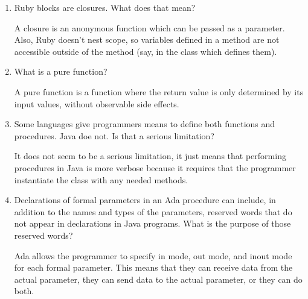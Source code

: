 \begin{enumerate}
\begin{answer}
    \end{answer}

  \item Ruby blocks are closures. What does that mean?

\begin{answer}

A closure is an anonymous function which can be passed as a parameter. Also, Ruby
 doesn't nest scope, so variables defined in a method are not accessible outside of
 the method (say, in the class which defines them).

    \end{answer}

  \item What is a pure function?

\begin{answer}


A pure function is a function where the return value is only determined by its
input values, without observable side effects.

    \end{answer}

  \item Some languages give programmers means to define
    both functions and procedures. Java doe not. Is that
    a serious limitation?

\begin{answer}

It does not seem to be a serious limitation, it just means that performing procedures
 in Java is more verbose because it requires that the programmer instantiate the
 class with any needed methods.


    \end{answer}

  \item Declarations of formal parameters in an Ada procedure
    can include, in addition to the names and types of the
    parameters, reserved words that do not appear in declarations
    in Java programs. 
    What is the purpose of those reserved words?

\begin{answer}

Ada allows the programmer to specify in mode, out mode, and inout mode for each
 formal parameter.  This means that they can receive data from the actual parameter,
 they can send data to the actual parameter, or they can do both.

    \end{answer}
 

\end{enumerate}
